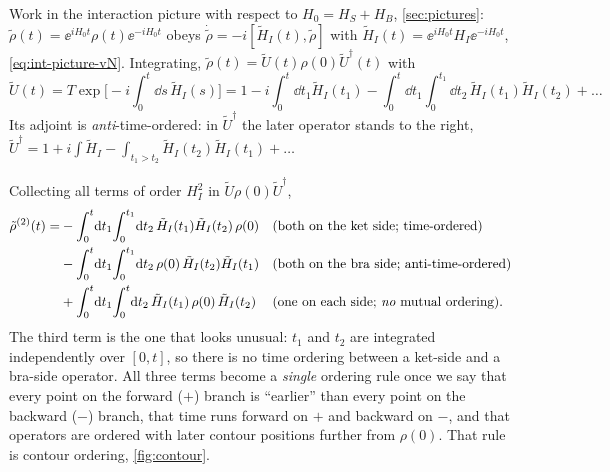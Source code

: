 Work in the interaction picture with respect to $H_0=H_S+H_B$, \cref{sec:pictures}: $\tilde\rho(t)=\ee^{iH_0t}\rho(t)\ee^{-iH_0t}$ obeys $\dot{\tilde\rho}=-i[\tilde H_I(t),\tilde\rho]$ with $\tilde H_I(t)=\ee^{iH_0t}H_I\ee^{-iH_0t}$, \cref{eq:int-picture-vN}.
Integrating, $\tilde\rho(t)=\tilde U(t)\rho(0)\tilde U^\dagger(t)$ with
\begin{equation}
  \tilde U(t)=T\exp\Big[-i\!\int_0^t\!\dd s\,\tilde H_I(s)\Big]
  =1-i\!\int_0^t\!\dd t_1\tilde H_I(t_1)-\!\int_0^t\!\dd t_1\!\int_0^{t_1}\!\dd t_2\,\tilde H_I(t_1)\tilde H_I(t_2)+\dots
\end{equation}
Its adjoint is \emph{anti}-time-ordered: in $\tilde U^\dagger$ the later operator stands to the right, $\tilde U^\dagger=1+i\int\tilde H_I-\int_{t_1>t_2}\tilde H_I(t_2)\tilde H_I(t_1)+\dots$

\begin{exbox}
Collecting all terms of order $H_I^2$ in $\tilde U\rho(0)\tilde U^\dagger$,
\begin{align}
  \tilde\rho^{(2)}(t)=&-\int_0^t\!\dd t_1\!\int_0^{t_1}\!\dd t_2\,\tilde H_I(t_1)\tilde H_I(t_2)\,\rho(0)
   &&\text{(both on the ket side; time-ordered)}\notag\\
  &-\int_0^t\!\dd t_1\!\int_0^{t_1}\!\dd t_2\,\rho(0)\,\tilde H_I(t_2)\tilde H_I(t_1)
   &&\text{(both on the bra side; anti-time-ordered)}\notag\\
  &+\int_0^t\!\dd t_1\!\int_0^{t}\!\dd t_2\,\tilde H_I(t_1)\,\rho(0)\,\tilde H_I(t_2)
   &&\text{(one on each side; \emph{no} mutual ordering)}.
  \label{eq:rho2}
\end{align}
The third term is the one that looks unusual: $t_1$ and $t_2$ are integrated independently over $[0,t]$, so there is no time ordering between a ket-side and a bra-side operator.
All three terms become a \emph{single} ordering rule once we say that every point on the forward ($+$) branch is ``earlier'' than every point on the backward ($-$) branch, that time runs forward on $+$ and backward on $-$, and that operators are ordered with later contour positions further from $\rho(0)$.
That rule is contour ordering, \cref{fig:contour}.
\end{exbox}

